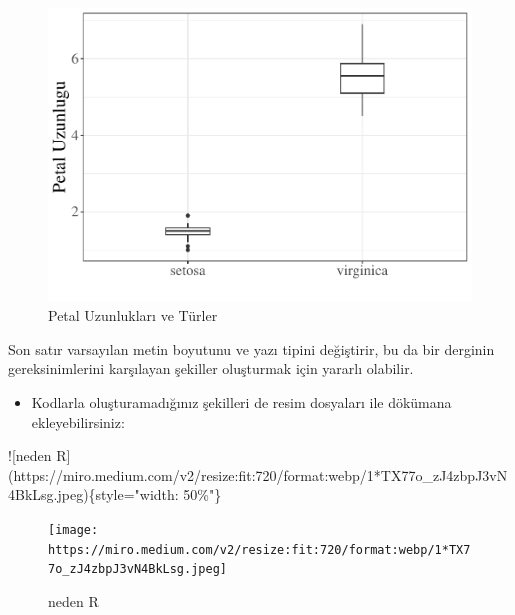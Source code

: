 \documentclass[
  oneside]{book}
\newenvironment{Shaded}{\begin{snugshade}}{\end{snugshade}}
\newcommand{\AlertTok}[1]{\textcolor[rgb]{0.94,0.16,0.16}{#1}}
\newcommand{\NormalTok}[1]{#1}
\providecommand{\tightlist}{%
  \setlength{\itemsep}{0pt}\setlength{\parskip}{0pt}}
\begin{document}
\begin{figure}

{\centering \includegraphics[width=1\linewidth]{06-markdown_files/figure-latex/pet-plot-out-1} 

}

\caption{ Petal Uzunlukları ve Türler}\label{fig:pet-plot-out}
\end{figure}

\begin{info}
Son satır varsayılan metin boyutunu ve yazı tipini değiştirir, bu da bir derginin gereksinimlerini karşılayan şekiller oluşturmak için yararlı olabilir.

\end{info}

\begin{itemize}
\tightlist
\item
  Kodlarla oluşturamadığınız şekilleri de resim dosyaları ile dökümana ekleyebilirsiniz:
\end{itemize}

\begin{Shaded}
\begin{Highlighting}[]
\AlertTok{![neden R](https://miro.medium.com/v2/resize:fit:720/format:webp/1*TX77o\_zJ4zbpJ3vN4BkLsg.jpeg)}\NormalTok{\{style="width: 50\%"\}}
\end{Highlighting}
\end{Shaded}

\begin{figure}
\centering
\texttt{[image: https://miro.medium.com/v2/resize:fit:720/format:webp/1*TX77o\_zJ4zbpJ3vN4BkLsg.jpeg]}
\caption{neden R}
\end{figure}
\end{document}
